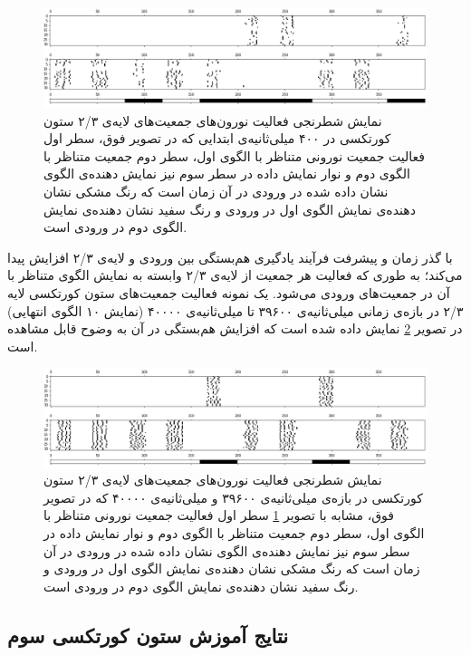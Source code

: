 \documentclass[12pt]{report}
\begin{document}
	\begin{figure}[H]
		\centering
		\includegraphics[width=1.0\linewidth]{c1-begining.png}
		\caption[NS]{
			نمایش شطرنجی فعالیت نورون‌های جمعیت‌های لایه‌ی ۲/۳ ستون کورتکسی در ۴۰۰ میلی‌ثانیه‌ی ابتدایی که در تصویر فوق، سطر اول فعالیت جمعیت نورونی متناظر با الگوی اول، سطر دوم جمعیت متناظر با الگوی دوم و نوار نمایش داده در سطر سوم نیز نمایش دهنده‌ی الگوی نشان داده شده در ورودی در آن زمان است که رنگ مشکی نشان‌ دهنده‌ی نمایش الگوی اول در ورودی و رنگ سفید نشان دهنده‌ی نمایش الگوی دوم در ورودی است.
		}
		\label{fig:c1-begining} 
	\end{figure}
	
	با گذر زمان و پیشرفت فرآیند یادگیری هم‌بستگی بین ورودی و لایه‌ی ۲/۳ افزایش پیدا می‌کند؛ به طوری که فعالیت هر جمعیت از لایه‌ی ۲/۳ وابسته به نمایش الگوی متناظر با آن در جمعیت‌های ورودی می‌شود. یک نمونه فعالیت جمعیت‌های ستون کورتکسی لایه‌ ۲/۳ در بازه‌ی زمانی میلی‌ثانیه‌ی ۳۹۶۰۰ تا میلی‌ثانیه‌ی ۴۰۰۰۰ (نمایش ۱۰ الگوی انتهایی) در تصویر \ref{fig:c1-final} نمایش داده شده است که افزایش هم‌بستگی در آن به وضوح قابل مشاهده است.
	
	\begin{figure}[H]
		\centering
		\includegraphics[width=1.0\linewidth]{c1-final.png}
		\caption[NS]{
			نمایش شطرنجی فعالیت نورون‌های جمعیت‌های لایه‌ی ۲/۳ ستون کورتکسی در بازه‌ی میلی‌ثانیه‌ی ۳۹۶۰۰ و میلی‌ثانیه‌ی ۴۰۰۰۰ که در تصویر فوق، مشابه با تصویر \ref{fig:c1-begining} سطر اول فعالیت جمعیت نورونی متناظر با الگوی اول، سطر دوم جمعیت متناظر با الگوی دوم و نوار نمایش داده در سطر سوم نیز نمایش دهنده‌ی الگوی نشان داده شده در ورودی در آن زمان است که رنگ مشکی نشان‌ دهنده‌ی نمایش الگوی اول در ورودی و رنگ سفید نشان دهنده‌ی نمایش الگوی دوم در ورودی است.
		}
		\label{fig:c1-final} 
	\end{figure}
	
	\subsection{نتایج آموزش ستون کورتکسی سوم}
	
\end{document}
